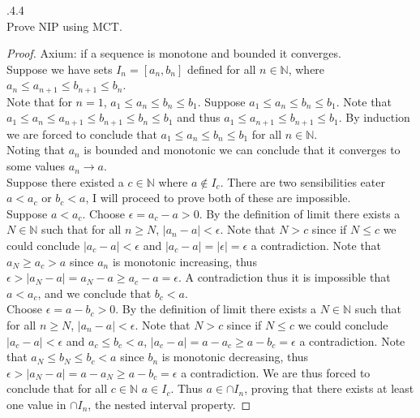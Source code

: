 \documentclass[12pt]{article}
\makeatletter
\theoremstyle{homework}
\newenvironment{exercise}[1]
{\def\@currentlabel{#1}\exercisecore}
{\endexercisecore}
\makeatother
\begin{document}
\begin{exercise}

2.4.4\\
Prove NIP using MCT.
\end{exercise}
\begin{proof}
Axium: if a sequence is monotone and bounded it converges.\\
Suppose we have sets $I_n=[a_n,b_n]$ defined for all $n\in\mathbb{N}$, where $a_n\leq a_{n+1}\leq b_{n+1}\leq b_n$.\\
Note that for $n=1$, $a_1\leq a_{n}\leq b_{n}\leq b_1$.  Suppose $a_1\leq a_{n}\leq b_{n}\leq b_1$.  Note that $a_1\leq a_{n}\leq a_{n+1}\leq b_{n+1}\leq  b_{n}\leq b_1$ and thus $a_1\leq a_{n+1}\leq b_{n+1}\leq b_1$.  By induction we are forced to conclude that $a_1\leq a_{n}\leq b_{n}\leq b_1$ for all $n\in \mathbb{N}$.\\
Noting that $a_n$ is bounded and monotonic we can conclude that it converges to some values $a_n\rightarrow a$.\\
Suppose there existed a $c\in \mathbb{N}$ where $a\not\in I_c$.  There are two sensibilities eater $a<a_c$ or $b_c<a$, I will proceed to prove both of these are impossible.\\
Suppose $a<a_c$.  Choose $\epsilon=a_c-a>0$.  By the definition of limit there exists a $N\in\mathbb{N}$ such that for all $n\geq N$, $|a_n-a|<\epsilon$.  Note that $N>c$ since if $N\leq c$ we could conclude $|a_c-a|<\epsilon$ and $|a_c-a|=|\epsilon|=\epsilon$ a contradiction.  Note that $a_N\geq a_c> a$ since $a_n$ is monotonic increasing, thus $\epsilon>|a_N-a|=a_N-a\geq a_c-a=\epsilon$.  A contradiction thus it is impossible that $a<a_c$, and we conclude that $b_c<a$.\\
Choose $\epsilon=a-b_c>0$.  By the definition of limit there exists a $N\in\mathbb{N}$ such that for all $n\geq N$, $|a_n-a|<\epsilon$.  Note that $N>c$ since if $N\leq c$ we could conclude $|a_c-a|<\epsilon$ and $a_c\leq b_c<a$, $|a_c-a|=a-a_c\geq a-b_c=\epsilon$ a contradiction.  Note that $a_N\leq b_N\leq b_c < a$ since $b_n$ is monotonic decreasing, thus $\epsilon>|a_N-a|=a-a_N\geq a-b_c=\epsilon$ a contradiction.  We are thus forced to conclude that for all $c\in\mathbb{N}$ $a\in I_c$.  Thus $a\in\cap I_n$, proving that there exists at least one value in $\cap I_n$, the nested interval property.
\end{proof}
\end{document}
